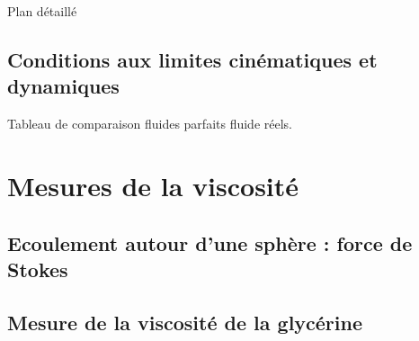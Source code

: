 \begin{reportBlock}{Plan détaillé}
\subsection{Conditions aux limites cinématiques et dynamiques}
Tableau de comparaison fluides parfaits fluide réels.

\section{Mesures de la viscosité}
\subsection{Ecoulement autour d'une sphère : force de Stokes}
\subsection{Mesure de la viscosité de la glycérine}

\end{reportBlock}
